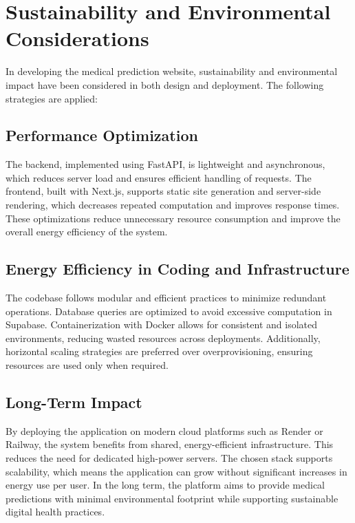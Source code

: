 \section{Sustainability and Environmental Considerations}

In developing the medical prediction website, sustainability and environmental 
impact have been considered in both design and deployment. The following strategies are applied:

\subsection*{Performance Optimization}
The backend, implemented using FastAPI, is lightweight and asynchronous,
which reduces server load and ensures efficient handling of requests.
The frontend, built with Next.js, supports static site generation and
server-side rendering, which decreases repeated computation and improves
response times. These optimizations reduce unnecessary resource consumption
and improve the overall energy efficiency of the system.

\subsection*{Energy Efficiency in Coding and Infrastructure}
The codebase follows modular and efficient practices to minimize redundant operations.
Database queries are optimized to avoid excessive computation in Supabase.
Containerization with Docker allows for consistent and isolated environments,
reducing wasted resources across deployments. Additionally, horizontal scaling strategies
are preferred over overprovisioning, ensuring resources are used only when required.

\subsection*{Long-Term Impact}
By deploying the application on modern cloud platforms such as Render or Railway,
the system benefits from shared, energy-efficient infrastructure.
This reduces the need for dedicated high-power servers.
The chosen stack supports scalability, which means the application
can grow without significant increases in energy use per user.
In the long term, the platform aims to provide medical predictions with minimal environmental
footprint while supporting sustainable digital health practices.

